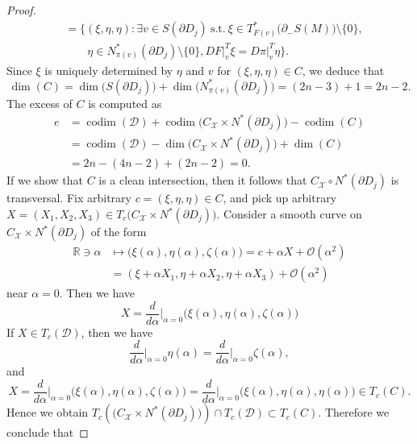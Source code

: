 \documentclass[a4paper,11pt,reqno]{amsart}
\numberwithin{equation}{section}
\theoremstyle{definition}
\theoremstyle{remark}
\begin{document}
\begin{proof}
\begin{align}
& =
  \bigl\{
  (\xi,\eta,\eta): 
  \exists v \in S({\partial}D_j)\ \text{s.t.}\  
  \xi \in T^\ast_{F(v)}\bigl(\partial_-S(M)\bigr)\setminus\{0\},
\nonumber
\\
& \qquad 
  \eta \in N^\ast_{\pi(v)}(\partial{D_j})\setminus\{0\},  
  DF\vert^T_v\xi=D\pi\vert^T_v\eta\bigr\}.
\label{equation:intersection4-1}
\end{align}
%
%
Since $\xi$ is uniquely determined by $\eta$ and $v$ for $(\xi,\eta,\eta) \in C$, we deduce that 
%
%
$$
\operatorname{dim}(C)
=
\operatorname{dim}\bigl(S(\partial{D}_j)\bigr)
+
\operatorname{dim}\bigl(N^\ast_{\pi(v)}(\partial{D_j})\bigr)
=
(2n-3)+1
=
2n-2.
$$
%
%
The excess of $C$ is computed as  
%
%
\begin{align*}
  e
& =
  \operatorname{codim}(\mathcal{D})
  +
  \operatorname{codim}\bigl(C_\mathcal{X}{\times}N^\ast(\partial{D_j})\bigr)
  -
  \operatorname{codim}(C)
\\
& =
  \operatorname{codim}(\mathcal{D})
  -
  \operatorname{dim}\bigl(C_\mathcal{X}{\times}N^\ast(\partial{D_j})\bigr)
  +
  \operatorname{dim}(C)
\\
& =
  2n-(4n-2)+(2n-2)
  =
  0. 
\end{align*} 
%
%
If we show that $C$ is a clean intersection, then it follows that $C_\mathcal{X}{\circ}N^\ast(\partial{D_j})$  is transversal. 
Fix arbitrary $c=(\xi,\eta,\eta) \in C$, and pick up arbitrary 
$X=(X_1,X_2,X_3) \in T_c\bigl(C_\mathcal{X}{\times}N^\ast(\partial{D_j})\bigr)$. Consider a smooth curve on 
$C_\mathcal{X}{\times}N^\ast(\partial{D_j})$ of the form 
%
%
\begin{align*}
  \mathbb{R}\ni\alpha 
& \mapsto 
  \bigl(\xi(\alpha),\eta(\alpha),\zeta(\alpha)\bigr)
  =
  c+\alpha{X}+\mathcal{O}(\alpha^2) 
\\
& =
  (\xi+\alpha{X}_1,\eta+\alpha{X}_2,\eta+\alpha{X}_3)+\mathcal{O}(\alpha^2)
\end{align*}
%
%
near $\alpha=0$. Then we have 
%
%
$$
X
=
\frac{d}{d\alpha}\bigg\vert_{\alpha=0}\bigl(\xi(\alpha),\eta(\alpha),\zeta(\alpha)\bigr)
$$
%
%
If $X \in T_c(\mathcal{D})$, then we have 
%
%
$$
\frac{d}{d\alpha}\bigg\vert_{\alpha=0}\eta(\alpha)
=
\frac{d}{d\alpha}\bigg\vert_{\alpha=0}\zeta(\alpha),
$$
%
%
and 
%
%
$$
X=
\frac{d}{d\alpha}\bigg\vert_{\alpha=0}\bigl(\xi(\alpha),\eta(\alpha),\zeta(\alpha)\bigr)
=
\frac{d}{d\alpha}\bigg\vert_{\alpha=0}\bigl(\xi(\alpha),\eta(\alpha),\eta(\alpha)\bigr)
\in 
T_c(C). 
$$
%
%
Hence we obtain $T_c(\bigl(C_\mathcal{X}{\times}N^\ast(\partial{D_j})\bigr)){\cap}T_c(\mathcal{D}){\subset}T_c(C)$. 
Therefore we conclude that 

\end{proof}
\end{document}
